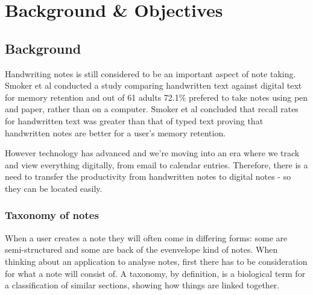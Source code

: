 \chapter{Background \& Objectives}






\section{Background}
Handwriting notes is still considered to be an important aspect of note taking. Smoker et al \cite{citeulike:13988059} conducted a study comparing handwritten text against digital text for memory retention and out of 61 adults 72.1\% prefered to take notes using pen and paper, rather than on a computer. Smoker et al concluded that recall rates for handwritten text was greater than that of typed text proving that handwritten notes are better for a user's memory retention.

However technology has advanced and we're moving into an era where we track and view everything digitally, from email to calendar entries. Therefore, there is a need to transfer the productivity from handwritten notes to digital notes - so they can be located easily.


\subsection{Taxonomy of notes}
When a user creates a note they will often come in differing forms: some are semi-structured and some are back of the evenvelope kind of notes. When thinking about an application to analyse notes, first there has to be consideration for what a note will consist of. A taxonomy, by definition, is a biological term for a classification of similar sections, showing how things are linked together. 

